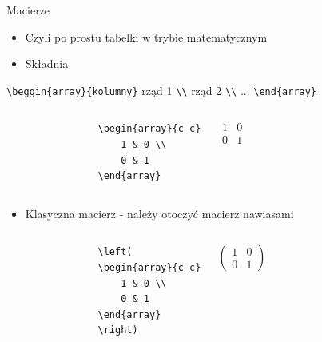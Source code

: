 \documentclass{beamer}
\theoremstyle{newblock}
\begin{document}
\begin{frame}[fragile]{Macierze}
    \begin{itemize}
        \item Czyli po prostu tabelki w trybie matematycznym
        \item Składnia
    \end{itemize}
        
    {\centering
    \verb|\beggin{array}{kolumny}| rząd 1 \verb|\\| rząd 2 \verb|\\| ... \verb|\end{array}|
    }   
    \begin{columns}
                \centering
                \begin{verbatim}
                \begin{array}{c c}
                    1 & 0 \\
                    0 & 1
                \end{array}
                \end{verbatim}
                \centering
                \begin{equation*}
                      \begin{array}{cc}1 & 0 \\ 0 & 1 \end{array} 
                \end{equation*}
    \end{columns}
    \begin{itemize}
        \item Klasyczna macierz - należy otoczyć macierz nawiasami
    \end{itemize}

    \begin{columns}
                \centering
                \begin{verbatim}
                \left(
                \begin{array}{c c}
                    1 & 0 \\
                    0 & 1
                \end{array}
                \right)
                \end{verbatim}
                \centering
                \begin{equation*}
                      \left( \begin{array}{cc}1 & 0 \\ 0 & 1 \end{array} \right) 
                \end{equation*}
    \end{columns}
\end{frame}
\end{document}
